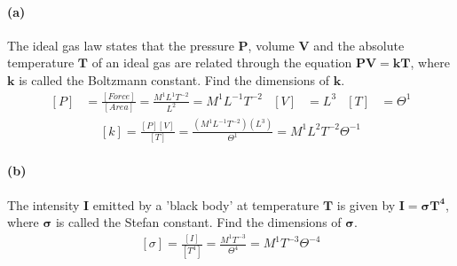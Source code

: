 \documentclass[]{article}
\begin{document}
{		\paragraph*{(a)} The ideal gas law states that the pressure $\bm{P}$, volume $\bm{V}$ and the absolute temperature $\bm{T}$ of an ideal gas are related through the
		equation $\bm{PV = kT}$, where $\bm{k}$ is called the Boltzmann constant. Find the dimensions of $\bm{k}$.
			\begin{equation*}
				\begin{aligned}
					\left[ P \right] &= \frac{[Force]}{[Area]} = \frac{M^1 L^1 T^{-2}}{L^2} =  M^1 L^{-1} T^{-2} & \left[ V \right] &= L^3  & \left[ T \right] &= \Theta^1 
				\end{aligned}
			\end{equation*}
			\begin{equation*}
				\begin{split}
					[k] = \frac{[P][V]}{[T]} = \frac{(M^1 L^{-1} T^{-2})(L^3)}{\Theta^1} = M^1 L^2 T^{-2} \Theta^{-1}
				\end{split}
			\end{equation*}
		
		\paragraph*{(b)} The intensity $\bm{I}$ emitted by a 'black body' at temperature $\bm{T}$ is given by $\bm{I = \sigma T^4}$, where $\bm{\sigma}$ is called the Stefan constant. Find the dimensions of $\bm{\sigma}$.
			\begin{equation*}
				\begin{split}
					[\sigma] = \frac{[I]}{[T^4]} = \frac{M^1 T^{-3}}{\Theta^4} = M^1 T^{-3} \Theta^{-4}
				\end{split}
			\end{equation*}
		
}
\end{document}
